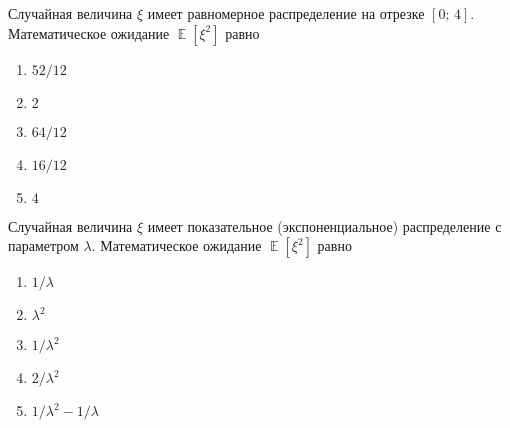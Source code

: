 \documentclass[t]{beamer}
\DeclareMathOperator{\E}{\mathbb{E}}
\begin{document}
 \begin{frame} \label{30} 
\begin{block}{30} 

Случайная величина $\xi$ имеет равномерное распределение на отрезке $[0;\,4]$. Математическое ожидание $\E[\xi^2]$ равно
  


 \end{block} 
\begin{enumerate} 
\item[] \hyperlink{30-No}{\beamergotobutton{}  $52/12$ }
\item[] \hyperlink{30-No}{\beamergotobutton{}  $2$ }
\item[] \hyperlink{30-Yes}{\beamergotobutton{}  $64/12$ }
\item[] \hyperlink{30-No}{\beamergotobutton{}  $16/12$ }
\item[] \hyperlink{30-No}{\beamergotobutton{}  $4$ }
\end{enumerate} 
\end{frame} 


 \begin{frame} \label{31} 
\begin{block}{31} 

Случайная величина $\xi$ имеет показательное (экспоненциальное) распределение с параметром $\lambda$. Математическое ожидание $\E[\xi^2]$ равно
  


 \end{block} 
\begin{enumerate} 
\item[] \hyperlink{31-No}{\beamergotobutton{}  $1/\lambda$ }
\item[] \hyperlink{31-No}{\beamergotobutton{}  $\lambda^2$ }
\item[] \hyperlink{31-No}{\beamergotobutton{}  $1/\lambda^2$ }
\item[] \hyperlink{31-Yes}{\beamergotobutton{}  $2/\lambda^2$ }
\item[] \hyperlink{31-No}{\beamergotobutton{}  $1/\lambda^2 - 1/ \lambda$ }
\end{enumerate} 
\end{frame} 
\end{document}
